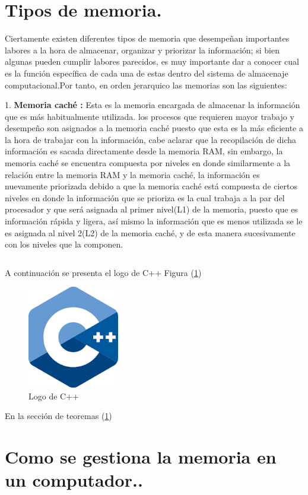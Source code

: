 \documentclass[12pt]{article}
\begin{document}
\section{Tipos de memoria.} \label{contenido}
Ciertamente existen diferentes tipos de memoria que desempeñan importantes labores a la hora de almacenar, organizar y priorizar la información; si bien algunas pueden cumplir labores parecidos, es muy importante dar a conocer cual es la función específica de cada una de estas dentro del sistema de almacenaje computacional.Por tanto, en orden jerarquico las memorias son las siguientes:

\vspace{15PT}
1. \textbf{Memoria caché :} 
Esta es la memoria encargada de almacenar la información que es más habitualmente utilizada. los procesos que requieren mayor trabajo y desempeño son asignados a la memoria caché puesto que esta es la más eficiente a la hora de trabajar con la información, cabe aclarar que la recopilación de dicha información es sacada directamente desde la memoria RAM, sin embargo, la memoria caché se encuentra compuesta por niveles en donde similarmente a la relación entre la memoria RAM y la memoria caché, la información es nuevamente priorizada debido a que la memoria caché está compuesta de ciertos niveles en donde la información que se prioriza es la cual  trabaja a la par del procesador y que será asignada al primer nivel(L1) de la memoria, puesto que es información rápida y ligera, así mismo la información que es menos utilizada se le es asignada al nivel 2(L2) de la memoria caché, y de esta manera sucesivamente con los niveles que la componen.

\cite{dirac}

\begin{lstlisting}

\end{lstlisting}

A continuación se presenta el logo de C++ Figura (\ref{fig:cpplogo})

\begin{figure}[h]
\includegraphics[width=4cm]{cpplogo.png}
\centering
\caption{Logo de C++}
\label{fig:cpplogo}
\end{figure}

En la sección de teoremas (\ref{contenido})

\section{Como se gestiona la memoria en un computador..} \label{conclulsion}



\end{document}
